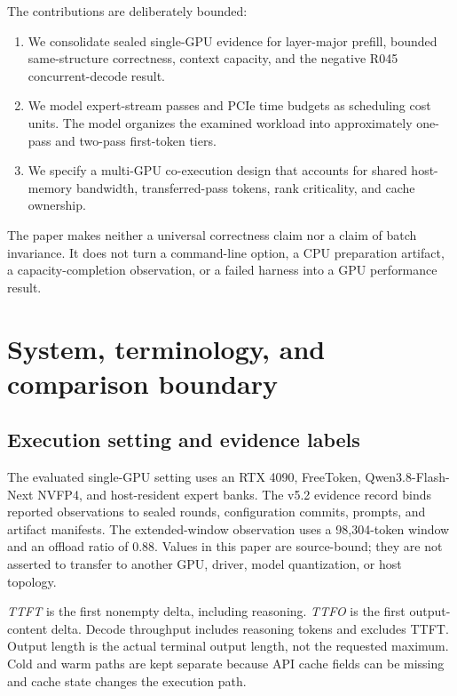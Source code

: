 \documentclass[11pt]{article}
\begin{document}
The contributions are deliberately bounded:
\begin{enumerate}
  \item We consolidate sealed single-GPU evidence for layer-major prefill, bounded same-structure correctness, context capacity, and the negative R045 concurrent-decode result.
  \item We model expert-stream passes and PCIe time budgets as scheduling cost units. The model organizes the examined workload into approximately one-pass and two-pass first-token tiers.
  \item We specify a multi-GPU co-execution design that accounts for shared host-memory bandwidth, transferred-pass tokens, rank criticality, and cache ownership.
\end{enumerate}
The paper makes neither a universal correctness claim nor a claim of batch invariance. It does not turn a command-line option, a CPU preparation artifact, a capacity-completion observation, or a failed harness into a GPU performance result.

\section{System, terminology, and comparison boundary}

\subsection{Execution setting and evidence labels}

The evaluated single-GPU setting uses an RTX 4090, FreeToken, Qwen3.8-Flash-Next NVFP4, and host-resident expert banks. The v5.2 evidence record binds reported observations to sealed rounds, configuration commits, prompts, and artifact manifests. The extended-window observation uses a 98,304-token window and an offload ratio of 0.88. Values in this paper are source-bound; they are not asserted to transfer to another GPU, driver, model quantization, or host topology.

\textit{TTFT} is the first nonempty delta, including reasoning. \textit{TTFO} is the first output-content delta. Decode throughput includes reasoning tokens and excludes TTFT. Output length is the actual terminal output length, not the requested maximum. Cold and warm paths are kept separate because API cache fields can be missing and cache state changes the execution path.
\end{document}
